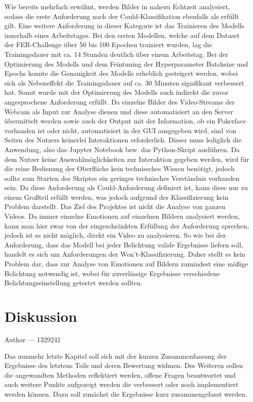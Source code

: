 \documentclass[12pt, a4paper]{report}
\makeatletter
\newcommand{\chapterauthor}[1]{%
  {\parindent0pt\vspace*{-25pt}%
  \large{Author --- }
  \linespread{1.1}\large\scshape#1%
  \par\nobreak\vspace*{35pt} }
  \@afterheading%
}
\makeatother
\begin{document}
Wie bereits mehrfach erwähnt, werden Bilder in nahezu Echtzeit analysiert, sodass die erste Anforderung nach der Could-Klassifikation ebenfalls als erfüllt gilt. Eine weitere Anforderung in dieser Kategorie ist das Trainieren des Modells innerhalb eines Arbeitstages. Bei den ersten Modellen, welche auf dem Dataset der FER-Challenge über 50 bis 100 Epochen trainiert wurden, lag die Trainingsdauer mit ca. 14 Stunden deutlich über einem Arbeitstag. Bei der Optimierung des Modells und dem Feintuning der Hyperparameter Batchsize und Epochs konnte die Genauigkeit des Modells erheblich gesteigert werden, wobei sich als Nebeneffekt die Trainingsdauer auf ca. 30 Minuten signifikant verbessert hat. Somit wurde mit der Optimierung des Modells auch indirekt die zuvor angesprochene Anforderung erfüllt. Da einzelne Bilder des Video-Streams der Webcam als Input zur Analyse dienen und diese automatisiert an den Server übermittelt werden sowie auch der Output mit der Information, ob ein Pokerface vorhanden ist oder nicht, automatisiert in der GUI ausgegeben wird, sind von Seiten des Nutzers keinerlei Interaktionen erforderlich. Dieser muss lediglich die Anwendung, also das Jupyter Notebook bzw. das Python-Skript ausführen. Da dem Nutzer keine Auswahlmöglichkeiten zur Interaktion gegeben werden, wird für die reine Bedienung der Oberfläche kein technissches Wissen benötigt, jedoch sollte zum Starten des Skriptes ein geringes technisches Verständnis vorhanden sein. Da diese Anforderung als Could-Anforderung definiert ist, kann diese nur zu einem Großteil erfüllt werden, was jedoch aufgrund der Klassifizierung kein Problem darstellt.\newline
Das Ziel des Projektes ist nicht die Analyse von ganzen Videos. Da immer einzelne Emotionen auf einzelnen Bildern analysiert werden, kann man hier zwar von der eingeschränkten Erfüllung der Anforderung sprechen, jedoch ist es nicht möglich, direkt ein Video zu analysieren. So wie bei der Anforderung, dass das Modell bei jeder Belichtung valide Ergebnisse liefern soll, handelt es sich um Anforderungen der Won't-Klassifizierung. Daher stellt es kein Problem dar, dass zur Analyse von Emotionen auf Bildern zumindest eine mäßige Belichtung notwendig ist, wobei für zuverlässige Ergebnisse verschiedene Belichtungseinstellung getestet werden sollten.

\let\cleardoublepage\relax
\chapter{Diskussion}
\chapterauthor{1329241}
Das nunmehr letzte Kapitel soll sich mit der kurzen Zusammenfassung der Ergebnisse des letztens Teils und deren Bewertung widmen. 
Des Weiteren sollen die angewandten Methoden reflektiert werden,
offene Fragen beantwortet und auch weitere Punkte aufgezeigt werden die verbessert oder noch implementiert werden können. Dazu soll zunächst die Ergebnisse kurz zusammengefasst werden.
\end{document}
